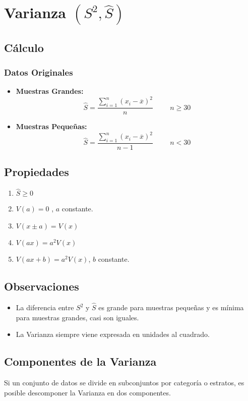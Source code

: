 \section{Varianza $(S^2,\hat{S})$}
\subsection{Cálculo}
\subsubsection{Datos Originales}
\begin{itemize}
\item \textbf{Muestras Grandes:}
$$\hat{S}=\dfrac{\displaystyle\sum_{i=1}^{n}(x_i-\overline{x})^2}{n} \hspace{1cm} n\geq 30$$
\item \textbf{Muestras Pequeñas:}
$$\hat{S}=\dfrac{\displaystyle\sum_{i=1}^{n}(x_i-\overline{x})^2}{n-1} \hspace{1cm} n< 30$$
\end{itemize}
\subsection{Propiedades}
\begin{enumerate}
\item $\hat{S}\geq 0$
\item $V(a)=0$ , $a$ constante.
\item $V(x \pm a) = V(x)$
\item $V(ax)=a^2V(x)$
\item $V(ax+b)=a^2V(x)$, $b$ constante.
\end{enumerate}
\subsection*{Observaciones}
\begin{itemize}
\item La diferencia entre $S^2$ y $\hat{S}$ es grande para muestras pequeñas y es mínima para muestras grandes, casi son iguales.
\item La Varianza siempre viene expresada en unidades al cuadrado.
\end{itemize}
\subsection{Componentes de la Varianza}
Si un conjunto de datos se divide en subconjuntos por categoría o estratos, es posible descomponer la Varianza en dos componentes.
